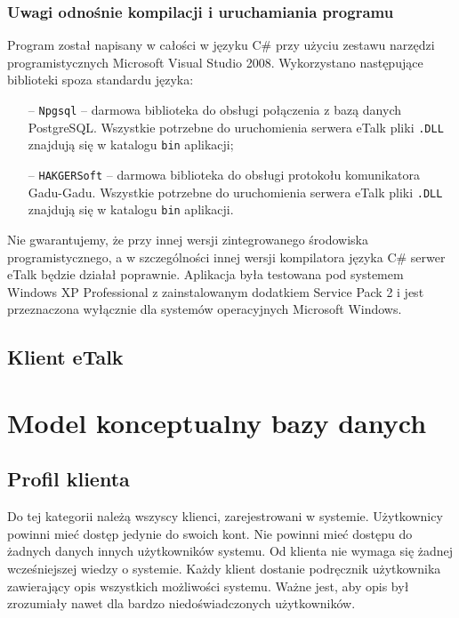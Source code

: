 \documentclass[a4paper,12pt]{article}
\begin{document}
\subsubsection[Uwagi odnośnie kompilacji i uruchamiania programu]{Uwagi odnośnie kompilacji i uruchamiania programu}
Program został napisany w całości w języku C\# przy użyciu zestawu narzędzi programistycznych
Microsoft Visual Studio 2008. Wykorzystano następujące biblioteki spoza standardu języka:
\begin{itemize}
    \item[--] \texttt{Npgsql} -- darmowa biblioteka do obsługi połączenia z bazą danych PostgreSQL. Wszystkie potrzebne do uruchomienia serwera eTalk pliki \texttt{.DLL} znajdują się w katalogu \texttt{bin} aplikacji;
    \item[--] \texttt{HAKGERSoft} -- darmowa biblioteka do obsługi protokołu komunikatora Gadu-Gadu. Wszystkie potrzebne do uruchomienia serwera eTalk pliki \texttt{.DLL} znajdują się w katalogu \texttt{bin} aplikacji.
\end{itemize}
Nie gwarantujemy, że przy innej wersji zintegrowanego środowiska programistycznego, a w szczególności innej wersji kompilatora języka C\# serwer eTalk będzie działał poprawnie.
Aplikacja była testowana pod systemem Windows XP Professional z zainstalowanym
dodatkiem Service Pack 2 i jest przeznaczona wyłącznie dla systemów operacyjnych Microsoft Windows.



\subsection[Klient eTalk]{Klient eTalk}



\section[Model konceptualny bazy danych]{Model konceptualny bazy danych}
\subsection[Profil klienta]{Profil klienta}
Do tej kategorii należą wszyscy klienci, zarejestrowani w systemie.
Użytkownicy powinni mieć dostęp jedynie do swoich kont. Nie powinni
mieć dostępu do żadnych danych innych użytkowników systemu.
Od klienta nie wymaga się żadnej wcześniejszej wiedzy o systemie. Każdy klient dostanie
podręcznik użytkownika zawierający opis wszystkich możliwości systemu.
Ważne jest, aby opis był zrozumiały nawet dla bardzo niedoświadczonych użytkowników.
\end{document}
